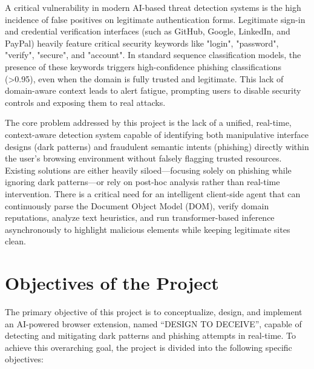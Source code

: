A critical vulnerability in modern AI-based threat detection systems is the high incidence of false positives on legitimate authentication forms. Legitimate sign-in and credential verification interfaces (such as GitHub, Google, LinkedIn, and PayPal) heavily feature critical security keywords like "login", "password", "verify", "secure", and "account". In standard sequence classification models, the presence of these keywords triggers high-confidence phishing classifications (>0.95), even when the domain is fully trusted and legitimate. This lack of domain-aware context leads to alert fatigue, prompting users to disable security controls and exposing them to real attacks.

The core problem addressed by this project is the lack of a unified, real-time, context-aware detection system capable of identifying both manipulative interface designs (dark patterns) and fraudulent semantic intents (phishing) directly within the user's browsing environment without falsely flagging trusted resources. Existing solutions are either heavily siloed—focusing solely on phishing while ignoring dark patterns—or rely on post-hoc analysis rather than real-time intervention. There is a critical need for an intelligent client-side agent that can continuously parse the Document Object Model (DOM), verify domain reputations, analyze text heuristics, and run transformer-based inference asynchronously to highlight malicious elements while keeping legitimate sites clean.

\section{Objectives of the Project}

The primary objective of this project is to conceptualize, design, and implement an AI-powered browser extension, named ``DESIGN TO DECEIVE'', capable of detecting and mitigating dark patterns and phishing attempts in real-time. To achieve this overarching goal, the project is divided into the following specific objectives:

